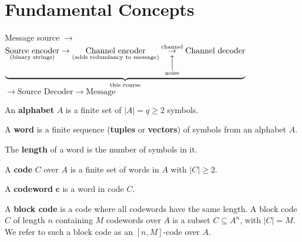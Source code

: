 \section{Fundamental Concepts}
Message source
$ \rightarrow $
$ \underbrace{
        \underset{\text{(binary strings)}}{\text{Source encoder}}
        \rightarrow
        \underset{\text{(adds redundancy to message)}}{\text{Channel encoder}}
        \underset{\overset{\Big\uparrow}{\text{noise}}}{\overset{\text{channel}}{\rightarrow}}
        \text{Channel decoder}}_{\text{this course}}$
$ \rightarrow \text{Source Decoder} \rightarrow \text{Message} $

\begin{defbox}
    \begin{definition}
        An \textbf{alphabet} $ A $ is a finite set of $ |A|= q\geqslant 2 $ symbols.
    \end{definition}
\end{defbox}

\begin{defbox}
    \begin{definition}
        A \textbf{word} is a finite sequence (\textbf{tuples} or \textbf{vectors})
        of symbols from an alphabet $ A $.
    \end{definition} \end{defbox}

\begin{defbox}
    \begin{definition}
        The \textbf{length} of a word is the number of symbols in it.
    \end{definition} \end{defbox}

\begin{defbox}
    \begin{definition}
        A \textbf{code} $ C $ over $ A $ is a finite set of words in $ A $
        with $ |C|\geqslant 2 $.
    \end{definition} \end{defbox}

\begin{defbox}
    \begin{definition}
        A \textbf{codeword} $ \bm{c} $ is a word in code $ C $.
    \end{definition} \end{defbox}

\begin{defbox}
    \begin{definition}
        A \textbf{block code} is a code where all codewords have the same length.
        A block code $ C $ of length $ n $ containing $ M $ codewords over $ A $
        is a subset $ C\subseteq A^n $, with $ |C|=M $. We refer to such a block
        code as an $ [n,M] $-code over $ A $.
    \end{definition}
\end{defbox}

